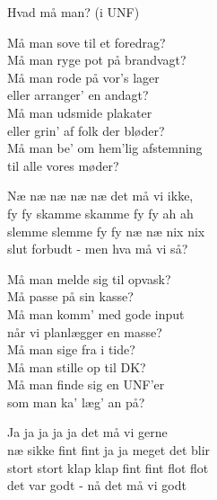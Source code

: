 \begin{song}{Hvad må man? (i UNF)}

  \begin{SBVerse}
    Må man sove til et foredrag?\\
    Må man ryge pot på brandvagt?\\
    Må man rode på vor’s lager\\
    eller arranger’ en andagt?\\\medskip
    Må man udsmide plakater\\
    eller grin’ af folk der bløder?\\
    Må man be’ om hem’lig afstemning\\
    til alle vores møder?
  \end{SBVerse}

  \begin{SBChorus}
    Næ næ næ næ næ det må vi ikke,\\
    fy fy skamme skamme fy fy ah ah\\
    slemme slemme fy fy næ næ nix nix\\
    slut forbudt - men hva må vi så?
  \end{SBChorus}


  \begin{SBVerse}
    Må man melde sig til opvask?\\
    Må passe på sin kasse?\\
    Må man komm’ med gode input\\
    når vi planlægger en masse?\\\medskip
    Må man sige fra i tide?\\
    Må man stille op til DK?\\
    Må man finde sig en UNF’er\\
    som man ka’ læg’ an på?
  \end{SBVerse}

  \begin{SBChorus}
    Ja ja ja ja ja det må vi gerne\\
    næ sikke fint fint ja ja meget det blir\\
    stort stort klap klap fint fint flot flot\\
    det var godt - nå det må vi godt
  \end{SBChorus}
\end{song}